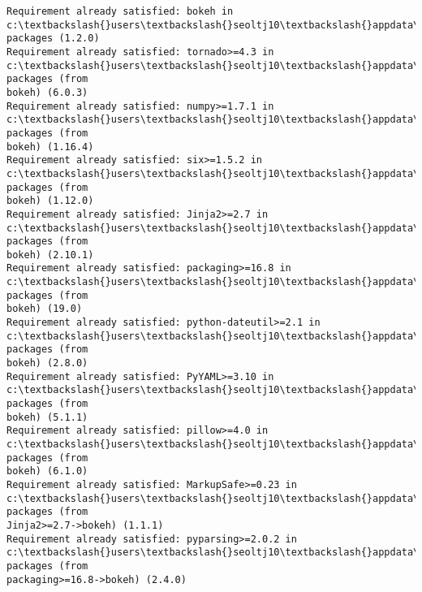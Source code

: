 \documentclass[11pt]{article}
\begin{document}
    \begin{Verbatim}[commandchars=\\\{\}]
Requirement already satisfied: bokeh in
c:\textbackslash{}users\textbackslash{}seoltj10\textbackslash{}appdata\textbackslash{}local\textbackslash{}continuum\textbackslash{}anaconda3\textbackslash{}lib\textbackslash{}site-packages (1.2.0)
Requirement already satisfied: tornado>=4.3 in
c:\textbackslash{}users\textbackslash{}seoltj10\textbackslash{}appdata\textbackslash{}local\textbackslash{}continuum\textbackslash{}anaconda3\textbackslash{}lib\textbackslash{}site-packages (from
bokeh) (6.0.3)
Requirement already satisfied: numpy>=1.7.1 in
c:\textbackslash{}users\textbackslash{}seoltj10\textbackslash{}appdata\textbackslash{}local\textbackslash{}continuum\textbackslash{}anaconda3\textbackslash{}lib\textbackslash{}site-packages (from
bokeh) (1.16.4)
Requirement already satisfied: six>=1.5.2 in
c:\textbackslash{}users\textbackslash{}seoltj10\textbackslash{}appdata\textbackslash{}local\textbackslash{}continuum\textbackslash{}anaconda3\textbackslash{}lib\textbackslash{}site-packages (from
bokeh) (1.12.0)
Requirement already satisfied: Jinja2>=2.7 in
c:\textbackslash{}users\textbackslash{}seoltj10\textbackslash{}appdata\textbackslash{}local\textbackslash{}continuum\textbackslash{}anaconda3\textbackslash{}lib\textbackslash{}site-packages (from
bokeh) (2.10.1)
Requirement already satisfied: packaging>=16.8 in
c:\textbackslash{}users\textbackslash{}seoltj10\textbackslash{}appdata\textbackslash{}local\textbackslash{}continuum\textbackslash{}anaconda3\textbackslash{}lib\textbackslash{}site-packages (from
bokeh) (19.0)
Requirement already satisfied: python-dateutil>=2.1 in
c:\textbackslash{}users\textbackslash{}seoltj10\textbackslash{}appdata\textbackslash{}local\textbackslash{}continuum\textbackslash{}anaconda3\textbackslash{}lib\textbackslash{}site-packages (from
bokeh) (2.8.0)
Requirement already satisfied: PyYAML>=3.10 in
c:\textbackslash{}users\textbackslash{}seoltj10\textbackslash{}appdata\textbackslash{}local\textbackslash{}continuum\textbackslash{}anaconda3\textbackslash{}lib\textbackslash{}site-packages (from
bokeh) (5.1.1)
Requirement already satisfied: pillow>=4.0 in
c:\textbackslash{}users\textbackslash{}seoltj10\textbackslash{}appdata\textbackslash{}local\textbackslash{}continuum\textbackslash{}anaconda3\textbackslash{}lib\textbackslash{}site-packages (from
bokeh) (6.1.0)
Requirement already satisfied: MarkupSafe>=0.23 in
c:\textbackslash{}users\textbackslash{}seoltj10\textbackslash{}appdata\textbackslash{}local\textbackslash{}continuum\textbackslash{}anaconda3\textbackslash{}lib\textbackslash{}site-packages (from
Jinja2>=2.7->bokeh) (1.1.1)
Requirement already satisfied: pyparsing>=2.0.2 in
c:\textbackslash{}users\textbackslash{}seoltj10\textbackslash{}appdata\textbackslash{}local\textbackslash{}continuum\textbackslash{}anaconda3\textbackslash{}lib\textbackslash{}site-packages (from
packaging>=16.8->bokeh) (2.4.0)
    \end{Verbatim}
\end{document}
